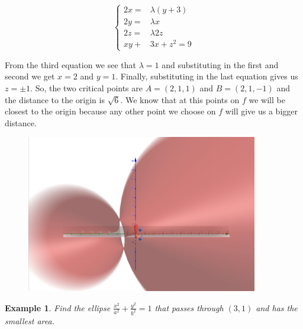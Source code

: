 \documentclass[]{article}
\newtheorem{example}{Example}
\begin{document}
\begin{equation*}
    \left\{
    \begin{alignedat}{3}
        2x= &\lambda(y+3) \\
        2y= &\lambda x \\
        2z= &\lambda 2z \\
        xy +& 3x +z^2 = 9
    \end{alignedat}
    \right.
\end{equation*}

From the third equation we see that $\lambda=1$ and substituting in the first and second we get $x=2$ and $y=1$. Finally, substituting in the last
equation gives us $z = \pm 1$. So, the two critical points are $A=(2,1,1)$ and $B=(2,1,-1)$ and the distance to the origin is $\sqrt{6}$.
We know that at this points on $f$ we will be closest to the origin because any other point we choose on $f$ will give us a bigger distance.

\begin{figure}[h]
    \centering
    \includegraphics[width=0.9\textwidth]{example1.png}
\end{figure}

\begin{example}
    Find the ellipse $\frac{x^2}{a^2} + \frac{y^2}{b^2} = 1$ that passes through $(3,1)$ and has the smallest area.
\end{example}
\end{document}
